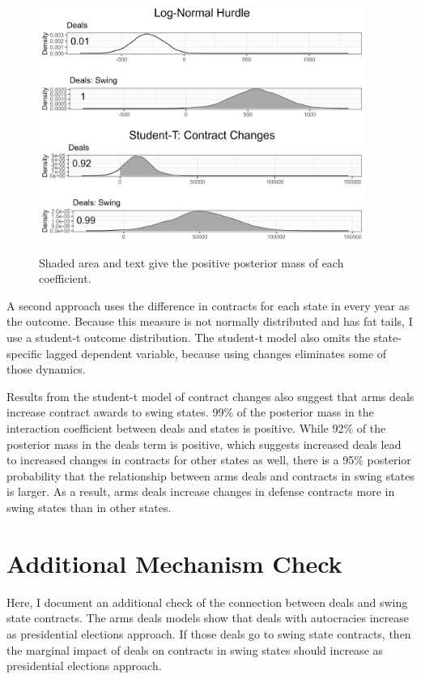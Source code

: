 \documentclass[12pt]{article}
\begin{document}
\begin{figure}[htpb]
	\centering
		\includegraphics[width=0.95\textwidth]{me-deals-check.png}
	\caption{Shaded area and text give the positive posterior mass of each coefficient.}
	\label{fig:me-deals-check}
\end{figure}


A second approach uses the difference in contracts for each state in every year as the outcome. 
Because this measure is not normally distributed and has fat tails, I use a student-t outcome distribution.
The student-t model also omits the state-specific lagged dependent variable, because using changes eliminates some of those dynamics. 


Results from the student-t model of contract changes also suggest that arms deals increase contract awards to swing states. 
99\% of the posterior mass in the interaction coefficient between deals and states is positive.
While 92\% of the posterior mass in the deals term is positive, which suggests increased deals lead to increased changes in contracts for other states as well, there is a 95\% posterior probability that the relationship between arms deals and contracts in swing states is larger. 
As a result, arms deals increase changes in defense contracts more in swing states than in other states. 


\newpage 

\section{Additional Mechanism Check}

Here, I document an additional check of the connection between deals and swing state contracts. 
The arms deals models show that deals with autocracies increase as presidential elections approach. 
If those deals go to swing state contracts, then the marginal impact of deals on contracts in swing states should increase as presidential elections approach. 
\end{document}
